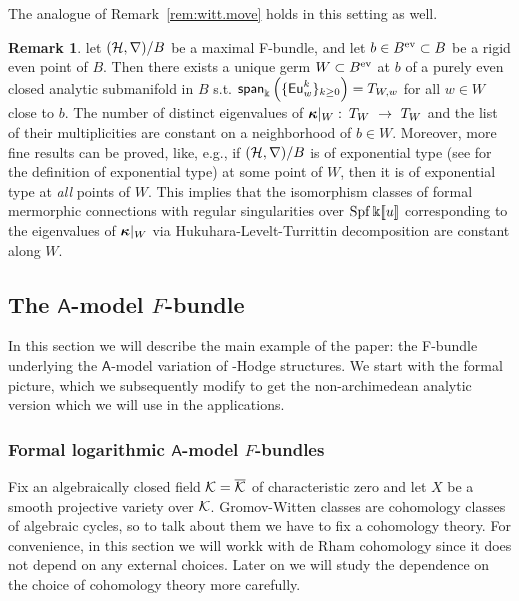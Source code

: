 \documentclass[twoside,leqno]{article}
\numberwithin{equation}{section}
\theoremstyle{plain}
\theoremstyle{definition}
\newtheorem{remark}[equation]{Remark}
\begin{document}
\noindent
The analogue of Remark~\ref{rem:witt.move} holds in this setting as well. 

\begin{remark} \label{rem:Fbundle.witt.move}
let $(\mathcal H,\nabla)/B$ be a maximal F-bundle, and let $b \in B^{\mathrm{ev}} \subset B$ be a rigid even point  of $B$. Then there exists a unique germ $W \subset B^{\mathrm{ev}}$ at $b$ of a purely even closed analytic submanifold in $B$ s.t. 
$\mathsf{span}_{\Bbbk}\left(\{\operatorname{\mathsf{Eu}}^{k}_{w}\}_{k\geq 0}\right) = T_{W,w}$ for all $w\in W$ close to $b$. 
The number of distinct eigenvalues of $\bkappa|_{W} \, \colon \, T_{W} \ \to \ T_{W}$ and the list of their multiplicities are constant on a neighborhood of $b \in W$. Moreover, more fine results can be proved, like, e.g., if $(\mathcal H,\nabla)/B$ is of exponential type (see \cite{Katzarkov_Hodge_theoretic_aspects} for the definition of exponential type) at some point of $W$, then it is of exponential type at \textit{all}  points of $W$. This implies that the isomorphism classes of formal mermorphic connections with regular singularities over $\operatorname{Spf}\Bbbk[\![u]\!]$ corresponding to the eigenvalues of $\boldsymbol{\kappa}|_{W}$ via Hukuhara-Levelt-Turrittin decomposition are constant along $W$.
\end{remark}

\subsection{The \texorpdfstring{$\mathsf{A}$}{A}-model \texorpdfstring{$F$}{F}-bundle} \label{subsec:Amodelexample}

In this section we will describe the main example of the paper: the F-bundle underlying the $\mathsf{A}$-model variation of \nc-Hodge structures.  We start with the formal picture, which we subsequently modify to get the non-archimedean analytic version which we will use in the applications.

\subsubsection{Formal logarithmic  \texorpdfstring{$\mathsf{A}$}{A}-model 
\texorpdfstring{$F$}{F}-bundles} \label{sssec:Amodelformal}

Fix an algebraically closed  field $\mathcal K = \overline{\mathcal K}$ of characteristic zero and let $X$ be a smooth projective variety over $\mathcal K$. Gromov-Witten classes are cohomology classes of algebraic cycles, so to talk about them we have to fix a cohomology theory. For convenience, in this section we will workk with de Rham cohomology since it does not depend on any external choices. Later on we will study the dependence on the choice of cohomology theory more carefully.
\end{document}
